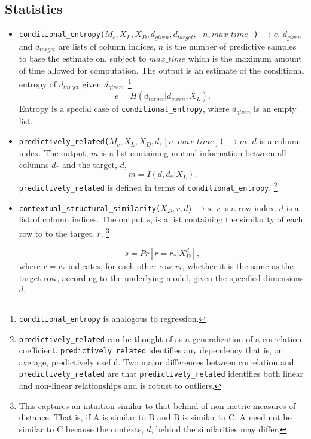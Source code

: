 \documentclass[11pt]{article}
\begin{document}
\subsection{Statistics}

\begin{itemize}

\item \texttt{conditional\_entropy($M_c, X_L,X_D,d_{given},d_{target}, [n, max\_time]$)} $\rightarrow e$. $d_{given}$ and $d_{target}$ are lists of column indices, $n$ is the number of predictive samples to base the estimate on, subject to $max\_time$ which is the maximum amount of time allowed for computation. The output is an estimate of the conditional entropy of $d_{target}$ given $d_{given}$,
\footnote{\texttt{conditional\_entropy} is analogous to regression.}
$$
e = H(d_{target}|d_{given},X_L).
$$
Entropy is a special case of \texttt{conditional\_entropy}, where $d_{given}$ is an empty list.

\item \texttt{predictively\_related($M_c, X_L, X_D, d, %
[n, max\_time]$)} $\rightarrow m$. 
$d$ is a column index. The output, $m$ is a list containing mutual information between all columns $d_*$ and the target, $d$,
$$
m = I(d,d_*|X_L).
$$
\texttt{predictively\_related} is defined in terms of \texttt{conditional\_entropy}. 
\footnote{\texttt{predictively\_related} can be thought of as a generalization of a correlation coefficient. \texttt{predictively\_related} identifies any dependency that is, on average, predictively useful. Two major differences between correlation and \texttt{predictively\_related} are that \texttt{predictively\_related} identifies both linear and non-linear relationships and is robust to outliers.}

\item \texttt{contextual\_structural\_similarity($X_D, r, d)$} $\rightarrow s$. 
$r$ is a row index. $d$ is a list of column indices. The output $s$, is a list containing the similarity of each row to to the target, $r$,
\footnote{This captures an intuition similar to that behind of non-metric measures of distance. That is, if A is similar to B and B is similar to C, A need not be similar to C because the contexts, $d$, behind the similarities may differ.}

$$
s = Pr[ r=r_*| X^d_D],
$$
where $r=r_*$ indicates, for each other row $r_*$, whether it is the same as the target row, according to the underlying model, given the specified dimensions $d$.


\end{itemize}
\end{document}
